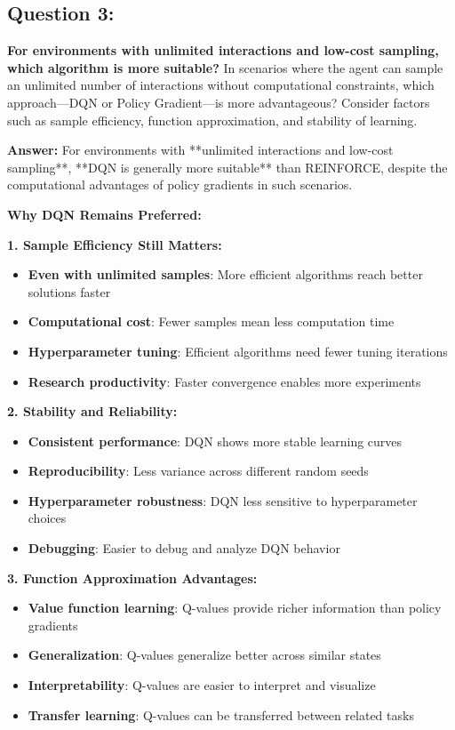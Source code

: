 \documentclass[12pt]{article}
\begin{document}
{{{\subsection{Question 3:}
\textbf{For environments with unlimited interactions and low-cost sampling, which algorithm is more suitable?}
\newline
In scenarios where the agent can sample an unlimited number of interactions without computational constraints, which approach—DQN or Policy Gradient—is more advantageous? Consider factors such as sample efficiency, function approximation, and stability of learning.

\textbf{Answer:} For environments with **unlimited interactions and low-cost sampling**, **DQN is generally more suitable** than REINFORCE, despite the computational advantages of policy gradients in such scenarios.

\textbf{Why DQN Remains Preferred:}

\textbf{1. Sample Efficiency Still Matters:}
\begin{itemize}
    \item \textbf{Even with unlimited samples}: More efficient algorithms reach better solutions faster
    \item \textbf{Computational cost}: Fewer samples mean less computation time
    \item \textbf{Hyperparameter tuning}: Efficient algorithms need fewer tuning iterations
    \item \textbf{Research productivity}: Faster convergence enables more experiments
\end{itemize}

\textbf{2. Stability and Reliability:}
\begin{itemize}
    \item \textbf{Consistent performance}: DQN shows more stable learning curves
    \item \textbf{Reproducibility}: Less variance across different random seeds
    \item \textbf{Hyperparameter robustness}: DQN less sensitive to hyperparameter choices
    \item \textbf{Debugging}: Easier to debug and analyze DQN behavior
\end{itemize}

\textbf{3. Function Approximation Advantages:}
\begin{itemize}
    \item \textbf{Value function learning}: Q-values provide richer information than policy gradients
    \item \textbf{Generalization}: Q-values generalize better across similar states
    \item \textbf{Interpretability}: Q-values are easier to interpret and visualize
    \item \textbf{Transfer learning}: Q-values can be transferred between related tasks
\end{itemize}

}}}
\end{document}

